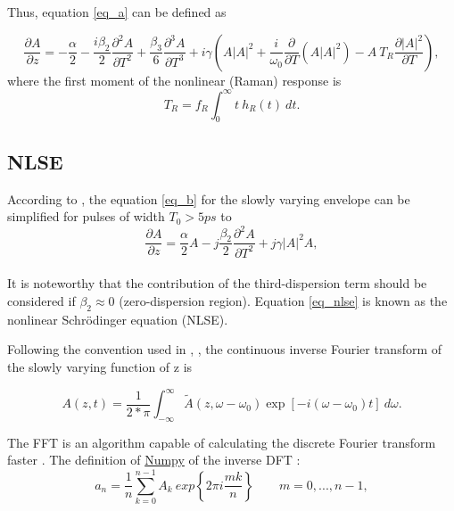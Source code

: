     Thus, equation \eqref{eq_a} can be defined as 
    
    \begin{equation}\label{eq_b}
        \frac{\partial A}{\partial z}=-\frac{\alpha}{2} - \frac{i \beta_2}{2} \frac{\partial^2 A}{\partial T^2} +\frac{\beta_3}{6} \frac{\partial^3 A}{\partial T^3} +i \gamma   \left(A\left|A\right|^2+ \frac{i}{\omega_0} \frac{\partial}{\partial T} (A\left|A \right|^2)- A \ T_R \frac{\partial \left|A \right|^2}{\partial T} \right),
        \end{equation}
    where the first moment of the nonlinear (Raman) response is
    \begin{equation}\label{eq_TR}
        T_R = f_R\int_{0}^{\infty} t \ h_R(t) \ dt.
    \end{equation}

        
    \subsection{NLSE}
        According to \citep{AgrawalBook}, the equation  \eqref{eq_b} for the slowly varying envelope can be simplified for pulses of width $T_0 > 5 ps$ to
        \begin{equation}
                \frac{\partial A}{\partial z} = \frac{\alpha}{2}A-j \frac{\beta_2}{2}\frac{\partial^2A}{\partial T^2}+j\gamma|A|^2 A,
                \label{eq_nlse}
            \end{equation}
            \ \\
       It is noteworthy that the contribution of the third-dispersion term should be considered if $\beta_2 \approx 0$ (zero-dispersion region). Equation \eqref{eq_nlse} is known as the nonlinear Schrödinger equation (NLSE).

           Following the convention used in \cite{AgrawalBook}, \cite{dudley_taylor_2010} , the continuous inverse Fourier transform of the slowly varying function of z is
        
        \begin{equation}\label{eq_acft}
            A(z,t) = \frac{1}{2*\pi} \int_{-\infty}^{\infty} \tilde{A}(z,\omega-\omega_0)\exp{[-i(\omega-\omega_0)t]} \ d\omega.
        \end{equation}
        
        
        The FFT is an algorithm capable of calculating the discrete Fourier transform faster \citep{Lynch2018}. The definition of \href{https://numpy.org/doc/stable/index.html}{Numpy} of the inverse DFT \cite{dft}: 
        \begin{equation}\label{eq_dft}
            a_n = \frac{1}{n}\sum_{k=0}^{n-1} A_k \ exp\left\{ 2\pi i \frac{mk}{n} \right\} \qquad m = 0,...,n-1,
        \end{equation}

